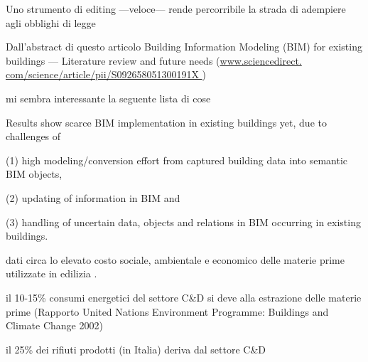 Uno strumento di editing ---veloce--- rende percorribile la strada di adempiere agli obblighi di legge

Dall’abstract di questo articolo Building Information Modeling (BIM) for existing buildings — Literature review and future needs (\url{www.sciencedirect.
com/science/article/pii/S092658051300191X }) 

mi sembra interessante la seguente lista di cose 

Results show scarce BIM implementation in existing buildings yet, due to challenges of 

(1) high modeling/conversion effort from captured building data into semantic BIM objects, 

(2) updating of information in BIM and 

(3) handling of uncertain data, objects and relations in BIM occurring in existing buildings.


dati circa lo elevato costo sociale, ambientale e economico delle materie prime utilizzate in edilizia .

il 10-15\% consumi energetici del settore C\&D si deve alla estrazione delle materie prime (Rapporto United Nations Environment Programme: Buildings and Climate Change 2002)

il 25\% dei rifiuti prodotti (in Italia) deriva dal settore C\&D

